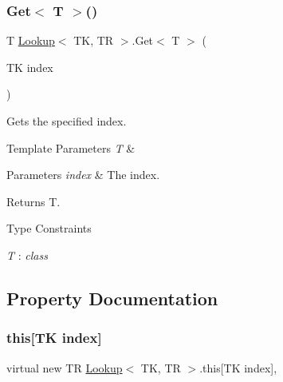 \subsubsection{\texorpdfstring{Get$<$ T $>$()}{Get< T >()}}
{\footnotesize\ttfamily T \hyperlink{class_lookup}{Lookup}$<$ TK, TR $>$.Get$<$ T $>$ (\begin{DoxyParamCaption}\item[{TK}]{index }\end{DoxyParamCaption})\hspace{0.3cm}{\ttfamily [inline]}}



Gets the specified index. 


\begin{DoxyTemplParams}{Template Parameters}
{\em T} & \\
\hline
\end{DoxyTemplParams}

\begin{DoxyParams}{Parameters}
{\em index} & The index.\\
\hline
\end{DoxyParams}
\begin{DoxyReturn}{Returns}
T.
\end{DoxyReturn}
\begin{Desc}
\item[Type Constraints]\begin{description}
\item[{\em T} : {\em class}]\end{description}
\end{Desc}


\subsection{Property Documentation}
\mbox{\label{class_lookup_a967e8091a6869de2da08ebf3b8cccf8a}} 
\subsubsection{\texorpdfstring{this[T\+K index]}{this[TK index]}}
{\footnotesize\ttfamily virtual new TR \hyperlink{class_lookup}{Lookup}$<$ TK, TR $>$.this\mbox{[}TK index\mbox{]}\hspace{0.3cm}{\ttfamily [get]}, {\ttfamily [set]}}



